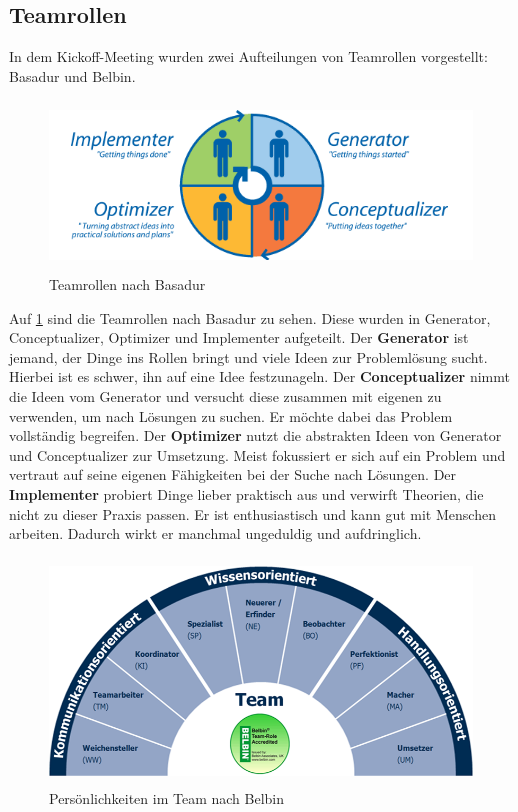 \documentclass[a4paper,12pt,headsepline]{scrartcl}
\begin{document}
	\subsection{Teamrollen}
		In dem Kickoff-Meeting wurden zwei Aufteilungen von Teamrollen vorgestellt: Basadur und Belbin.
		\begin{figure} [H]
			\centering
			\includegraphics[height=4.5cm]{Images/Basadur.png}
			\caption{Teamrollen nach Basadur}
			\label{fig:Basadur}
		\end{figure}
		Auf \cref{fig:Basadur} sind die Teamrollen nach Basadur zu sehen. Diese wurden in Generator, Conceptualizer, Optimizer und Implementer aufgeteilt. Der \textbf{Generator} ist jemand, der Dinge ins Rollen bringt und viele Ideen zur Problemlösung sucht. Hierbei ist es schwer, ihn auf eine Idee festzunageln. Der \textbf{Conceptualizer} nimmt die Ideen vom Generator und versucht diese zusammen mit eigenen zu verwenden, um nach Lösungen zu suchen. Er möchte dabei das Problem vollständig begreifen. Der \textbf{Optimizer} nutzt die abstrakten Ideen von Generator und Conceptualizer zur Umsetzung. Meist fokussiert er sich auf ein Problem und vertraut auf seine eigenen Fähigkeiten bei der Suche nach Lösungen. Der \textbf{Implementer} probiert Dinge lieber praktisch aus und verwirft Theorien, die nicht zu dieser Praxis passen. Er ist enthusiastisch und kann gut mit Menschen arbeiten. Dadurch wirkt er manchmal ungeduldig und aufdringlich.\
		\begin{figure} [H]
			\centering
			\includegraphics[height=6cm, width=12cm]{Images/Belbin.png}
			\caption{Persönlichkeiten im Team nach Belbin}
			\label{fig:Belbin}
		\end{figure}
\end{document}
